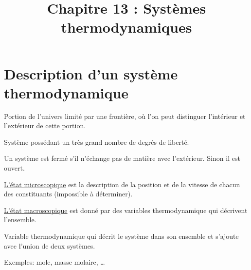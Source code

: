\documentclass[12pt]{article}
\title{Chapitre 13 : Systèmes thermodynamiques}
\author{}
\date{}
\theoremstyle{cstyle}{\newtheorem{definition}{Définition}[section]}
\theoremstyle{cstyle}{\newtheorem{proposition}[definition]{Propriété}}
\theoremstyle{mystyle}{\newtheorem{theorem}[definition]{Théorème}}
\theoremstyle{mystyle}{\newtheorem{lemma}[definition]{Lemme}}
\theoremstyle{mystyle}{\newtheorem{corollary}[definition]{Corollaire}}
\theoremstyle{mystyle}{\newtheorem*{remark}{Remarque}}
\theoremstyle{mystyle}{\newtheorem*{remarks}{Remarques}}
\theoremstyle{mystyle}{\newtheorem*{example}{Exemple}}
\theoremstyle{mystyle}{\newtheorem*{examples}{Exemples}}
\theoremstyle{definition}{\newtheorem*{exercise}{Exercice}}
\theoremstyle{mystyle}{\newtheorem*{methode}{Méthode}}
\theoremstyle{cstyle}{\newtheorem*{cthm}{}}
\theoremstyle{warn}
\begin{document}
\maketitle

\begin{minipage}[t]{0.45\textwidth}
	\section{Description d'un système thermodynamique}
	\begin{definition}[Système]
		Portion de l'univers limité par une frontière, où l'on peut distinguer l'intérieur et l'extérieur de cette portion.
	\end{definition}
	\begin{definition}
		Système possédant un très grand nombre de degrés de liberté.
	\end{definition}
	\begin{definition}
		Un système est fermé s'il n'échange pas de matière avec l'extérieur. Sinon il est ouvert.
	\end{definition}
	\begin{definition}
		\underline{L'état microscopique} est la description de la position et de la vitesse de chacun des constituants (impossible à déterminer).
		
		\underline{L'état macroscopique} est donné par des variables thermodynamique qui décrivent l'ensemble.
	\end{definition}

	\begin{definition}
		Variable thermodynamique qui décrit le système dans son ensemble et s'ajoute avec l'union de deux systèmes.
		
		Exemples: mole, masse molaire, \dots
	\end{definition}

	
	
\end{minipage}
\hfill
\vrule
\hfill
\end{document}

